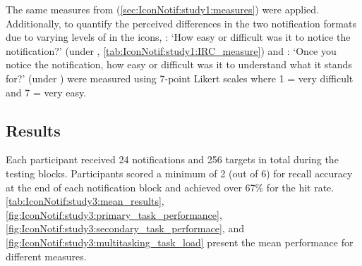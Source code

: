 The same measures from \studyone{} (\autoref{sec:IconNotif:study1:measures}) were applied. Additionally, to quantify the perceived differences in the two notification formats due to varying levels of \complexity{} in the icons, \noticeability{}: `How easy or difficult was it to notice the notification?' \cite{rzayev_effects_2020} (under \Reaction{}, \autoref{tab:IconNotif:study1:IRC_measure}) and \understandability{}: `Once you notice the notification, how easy or difficult was it to understand what it stands for?' \cite{rzayev_effects_2020} (under \Comprehension{}) were measured using 7-point Likert scales where 1 = very difficult and 7 = very easy.

\subsection{Results}
\label{sec:IconNotif:study3:results}

Each participant received 24 notifications and 256 targets in total during the testing blocks. Participants scored a minimum of 2 (out of 6) for recall accuracy at the end of each notification block and achieved over 67\% for the hit rate. \autoref{tab:IconNotif:study3:mean_results}, \autoref{fig:IconNotif:study3:primary_task_performance}, \autoref{fig:IconNotif:study3:secondary_task_performace}, and \autoref{fig:IconNotif:study3:multitasking_task_load} present the mean performance for different measures.


